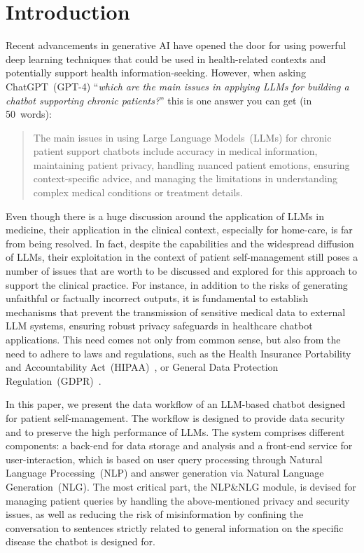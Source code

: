 \documentclass[preprint,12pt]{elsarticle}
\begin{document}

\section{Introduction}

Recent advancements in generative AI have opened the door for using powerful deep learning techniques that could be used in health-related contexts and potentially support health information-seeking.
%
However, when asking ChatGPT~(GPT-4) ``\emph{which are the main issues in applying LLMs for building a chatbot supporting chronic patients?}'' this is one answer you can get (in 50~words):
%
\begin{quote}
The main issues in using Large Language Models~(LLMs) for chronic patient support chatbots include accuracy in medical information, maintaining patient privacy, handling nuanced patient emotions, ensuring context-specific advice, and managing the limitations in understanding complex medical conditions or treatment details.
\end{quote}
%
Even though there is a huge discussion around the application of LLMs in medicine, their application in the clinical context, especially for home-care, is far from being resolved.
%
In fact, despite the capabilities and the widespread diffusion of LLMs, their exploitation in the context of patient self-management still poses a number of issues that are worth to be discussed and explored for this approach to support the clinical practice.
%
For instance, in addition to the risks of generating unfaithful or factually incorrect outputs, it is fundamental to establish mechanisms that prevent the transmission of sensitive medical data to external LLM systems, ensuring robust privacy safeguards in healthcare chatbot applications. 
%
This need comes not only from common sense, but also from the need to adhere to laws and regulations, such as the Health Insurance Portability and Accountability Act~(HIPAA)~\cite{hipaa}, or General Data Protection Regulation~(GDPR)~\cite{gdpr,Zichichi20224515}.

In this paper, we present the data workflow of an LLM-based chatbot designed for patient self-management.
%
The workflow is designed to provide data security and to preserve the high performance of LLMs.
%
The system comprises different components: a back-end for data storage and analysis and a front-end service for user-interaction, which is based on user query processing through Natural Language Processing~(NLP) and answer generation via Natural Language Generation~(NLG).
%
The most critical part, the NLP\&NLG module, is devised for managing patient queries by handling the above-mentioned privacy and security issues, as well as reducing the risk of misinformation by confining the conversation to sentences strictly related to general information on the specific disease the chatbot is designed for.
  
\end{document}
